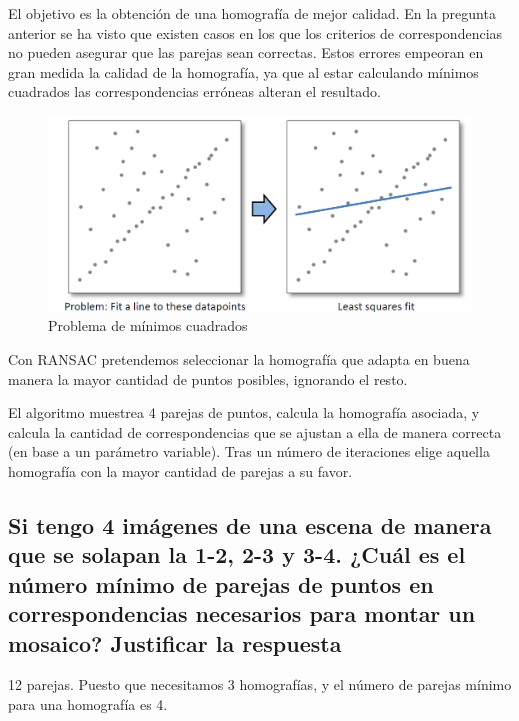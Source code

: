 \documentclass[11pt]{scrartcl} %
\begin{document}

El objetivo es la obtención de una homografía de mejor calidad.
En la pregunta anterior se ha visto que existen casos en los que los criterios de 
correspondencias no pueden asegurar que las parejas sean correctas. Estos errores
empeoran en gran medida la calidad de la homografía, ya que al estar calculando mínimos 
cuadrados las correspondencias erróneas alteran el resultado.

\begin{figure}[h]
	\centering
	\includegraphics[width=1.0\columnwidth]{2.png}
	\caption{Problema de mínimos cuadrados}
\end{figure}

Con RANSAC pretendemos seleccionar la homografía que adapta en buena manera la 
mayor cantidad de puntos posibles, ignorando el resto. \newline

El algoritmo muestrea 4 parejas de puntos, calcula la homografía asociada, y 
calcula la cantidad de correspondencias que se ajustan a ella de manera correcta
(en base a un parámetro variable). Tras un número de iteraciones elige aquella 
homografía con la mayor cantidad de parejas a su favor.

\subsection{Si tengo 4 imágenes de una escena de manera que se solapan la
1-2, 2-3 y 3-4. ¿Cuál es el número mínimo de parejas de puntos en
correspondencias necesarios para montar un mosaico? Justificar la
respuesta}


12 parejas. \newline 
Puesto que necesitamos 3 homografías, y el número de parejas mínimo para una 
homografía es 4. \newline
\end{document}
